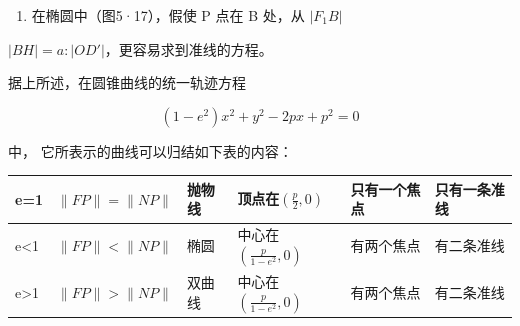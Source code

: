 \begin{enumerate}
\def\labelenumi{\arabic{enumi}.}
\setcounter{enumi}{2}
\tightlist
\item
  在椭圆中（图5·17），假使 P 点在 B 处，从 \(\left|F_{1}B\right|\)
\end{enumerate}

\(\left|BH\right|=a:\left|OD'\right|\)，更容易求到准线的方程。

据上所述，在圆锥曲线的统一轨迹方程

\[
(1 - e^{2}) x^{2} + y^{2} - 2 p x + p^{2} = 0
\]

中， 它所表示的曲线可以归结如下表的内容：

{\def\LTcaptype{none} %
\begin{longtable}[]{@{}
  >{\raggedright\arraybackslash}p{}
  >{\raggedright\arraybackslash}p{}
  >{\raggedright\arraybackslash}p{}
  >{\raggedright\arraybackslash}p{}
  >{\raggedright\arraybackslash}p{}
  >{\raggedright\arraybackslash}p{}@{}}
\toprule\noalign{}
\begin{minipage}[b]{\linewidth}\raggedright
e=1
\end{minipage} & \begin{minipage}[b]{\linewidth}\raggedright
\(\|FP\|=\|NP\|\)
\end{minipage} & \begin{minipage}[b]{\linewidth}\raggedright
抛物线
\end{minipage} & \begin{minipage}[b]{\linewidth}\raggedright
顶点在\(\left(\frac{p}{2},0\right)\)
\end{minipage} & \begin{minipage}[b]{\linewidth}\raggedright
只有一个焦点
\end{minipage} & \begin{minipage}[b]{\linewidth}\raggedright
只有一条准线
\end{minipage} \\
\midrule\noalign{}
\endhead
\bottomrule\noalign{}
\endlastfoot
e\textless1 & \(\|FP\|<\|NP\|\) & 椭圆 &
中心在\(\left(\frac{p}{1-e^{2}},0\right)\) & 有两个焦点 & 有二条准线 \\
e\textgreater1 & \(\|FP\|>\|NP\|\) & 双曲线 &
中心在\(\left(\frac{p}{1-e^{2}},0\right)\) & 有两个焦点 & 有二条准线 \\
\end{longtable}
}

